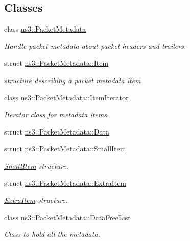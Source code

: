 \subsection*{Classes}
\begin{DoxyCompactItemize}
\item 
class \hyperlink{classns3_1_1PacketMetadata}{ns3\+::\+Packet\+Metadata}
\begin{DoxyCompactList}\small\item\em Handle packet metadata about packet headers and trailers. \end{DoxyCompactList}\item 
struct \hyperlink{structns3_1_1PacketMetadata_1_1Item}{ns3\+::\+Packet\+Metadata\+::\+Item}
\begin{DoxyCompactList}\small\item\em structure describing a packet metadata item \end{DoxyCompactList}\item 
class \hyperlink{classns3_1_1PacketMetadata_1_1ItemIterator}{ns3\+::\+Packet\+Metadata\+::\+Item\+Iterator}
\begin{DoxyCompactList}\small\item\em Iterator class for metadata items. \end{DoxyCompactList}\item 
struct \hyperlink{structns3_1_1PacketMetadata_1_1Data}{ns3\+::\+Packet\+Metadata\+::\+Data}
\item 
struct \hyperlink{structns3_1_1PacketMetadata_1_1SmallItem}{ns3\+::\+Packet\+Metadata\+::\+Small\+Item}
\begin{DoxyCompactList}\small\item\em \hyperlink{structns3_1_1PacketMetadata_1_1SmallItem}{Small\+Item} structure. \end{DoxyCompactList}\item 
struct \hyperlink{structns3_1_1PacketMetadata_1_1ExtraItem}{ns3\+::\+Packet\+Metadata\+::\+Extra\+Item}
\begin{DoxyCompactList}\small\item\em \hyperlink{structns3_1_1PacketMetadata_1_1ExtraItem}{Extra\+Item} structure. \end{DoxyCompactList}\item 
class \hyperlink{classns3_1_1PacketMetadata_1_1DataFreeList}{ns3\+::\+Packet\+Metadata\+::\+Data\+Free\+List}
\begin{DoxyCompactList}\small\item\em Class to hold all the metadata. \end{DoxyCompactList}\end{DoxyCompactItemize}
